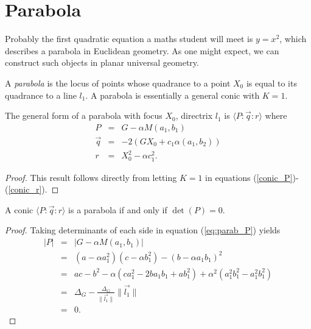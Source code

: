 \section{Parabola}

Probably the first quadratic equation a maths student will meet is $y = x^2$, which describes a parabola in Euclidean geometry.
As one might expect, we can construct such objects in planar universal geometry.

\begin{definition}A \emph{parabola} is the locus of points whose quadrance to a point $X_0$ is equal to its quadrance to a line $l_1$. A parabola is essentially a general conic with $K = 1$.
\end{definition}
\begin{theorem}
The general form of a parabola with focus $X_0$, directrix $l_1$ is $\langle P\!:\!\vec{q}\!:\!r \rangle$ where
\begin{eqnarray}
P & = & G - \alpha M(a_1, b_1)\label{eq:parab_P}\\
\vec{q} & = & -2(GX_0 + c_1\alpha(a_1, b_2))\\
r & = & X_0^2 - \alpha c_1^2.
\end{eqnarray}
\end{theorem}

\begin{proof}
This result follows directly from letting $K=1$ in equations (\ref{conic_P})-(\ref{conic_r}).
\end{proof}

\begin{theorem}\label{th:para}
A conic $\langle P\!:\!\vec{q}\!:\!r \rangle$ is a parabola if and only if $\det(P) = 0$.
\end{theorem}
\begin{proof}
Taking determinants of each side in equation (\ref{eq:parab_P}) yields
\begin{eqnarray}
\left|P\right| & = & \left|G - \alpha M(a_1, b_1)\right|\nonumber\\
 & = & (a - \alpha a_1^2)(c - \alpha b_1^2) - (b - \alpha a_1b_1)^2\nonumber\\
 & = & ac - b^2 - \alpha(ca_1^2 - 2ba_1b_1 + ab_1^2) + \alpha^2(a_1^2b_1^2 - a_1^2b_1^2)\nonumber\\
 & = & \Delta_G - \frac{\Delta_G}{\|\vec{l_1}\|}\|\vec{l_1}\|\nonumber\\
 & = & 0.\nonumber
\end{eqnarray}
\end{proof}

